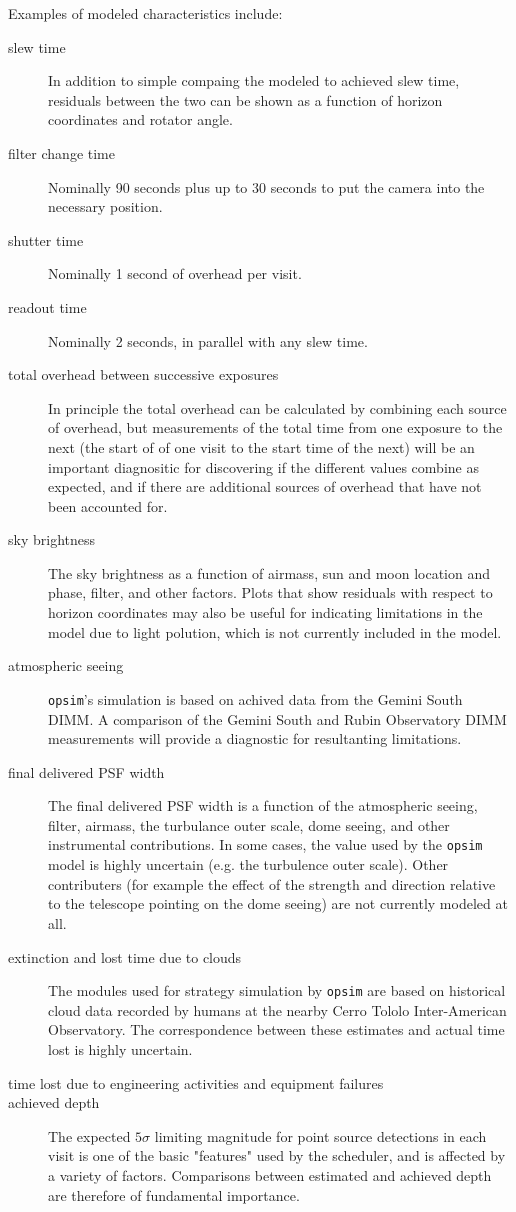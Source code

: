 Examples of modeled characteristics include:
\begin{description}
\item[{slew time}] In addition to simple compaing the modeled to achieved slew time, residuals between the two can be shown as a function of horizon coordinates and rotator angle.
\item[{filter change time}] Nominally 90 seconds plus up to 30 seconds to put the camera into the necessary position.
\item[{shutter time}] Nominally 1 second of overhead per visit.
\item[{readout time}] Nominally 2 seconds, in parallel with any slew time.
\item[{total overhead between successive exposures}] In principle the total overhead can be calculated by combining each source of overhead, but measurements of the total time from one exposure to the next (the start of of one visit to the start time of the next) will be an important diagnositic for discovering if the different values combine as expected, and if there are additional sources of overhead that have not been accounted for.
\item[{sky brightness}] The sky brightness as a function of airmass, sun and moon location and phase, filter, and other factors. Plots that show residuals with respect to horizon coordinates may also be useful for indicating limitations in the model due to light polution, which is not currently included in the model.
\item[{atmospheric seeing}] \texttt{opsim}'s simulation is based on achived data from the Gemini South DIMM. A comparison of the Gemini South and Rubin Observatory DIMM measurements will provide a diagnostic for resultanting limitations.
\item[{final delivered PSF width}] The final delivered PSF width is a function of the atmospheric seeing, filter, airmass, the turbulance outer scale, dome seeing, and other instrumental contributions. In some cases, the value used by the \texttt{opsim} model is highly uncertain (e.g. the turbulence outer scale). Other contributers (for example the effect of the strength and direction relative to the telescope pointing on the dome seeing) are not currently modeled at all.
\item[{extinction and lost time due to clouds}] The modules used for strategy simulation by \texttt{opsim} are based on historical cloud data recorded by humans at the nearby Cerro Tololo Inter-American Observatory. The correspondence between these estimates and actual time lost is highly uncertain.
\item[{time lost due to engineering activities and equipment failures}] 

\item[{achieved depth}] The expected \(5 \sigma\) limiting magnitude for point source detections in each visit is one of the basic "features" used by the scheduler, and is affected by a variety of factors. Comparisons between estimated and achieved depth are therefore of fundamental importance.
\end{description}

